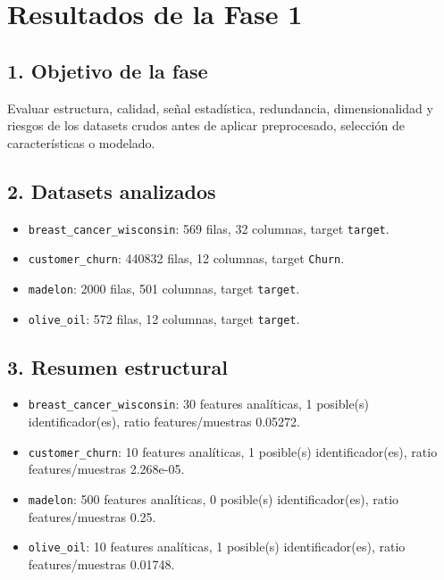\section{Resultados de la Fase 1}

\subsection{1. Objetivo de la fase}
Evaluar estructura, calidad, señal estadística, redundancia, dimensionalidad y riesgos de los datasets crudos antes de aplicar preprocesado, selección de características o modelado.
\subsection{2. Datasets analizados}
\begin{itemize}
\item \texttt{breast\_cancer\_wisconsin}: 569 filas, 32 columnas, target \texttt{target}.
\item \texttt{customer\_churn}: 440832 filas, 12 columnas, target \texttt{Churn}.
\item \texttt{madelon}: 2000 filas, 501 columnas, target \texttt{target}.
\item \texttt{olive\_oil}: 572 filas, 12 columnas, target \texttt{target}.
\end{itemize}

\subsection{3. Resumen estructural}
\begin{itemize}
\item \texttt{breast\_cancer\_wisconsin}: 30 features analíticas, 1 posible(s) identificador(es), ratio features/muestras 0.05272.
\item \texttt{customer\_churn}: 10 features analíticas, 1 posible(s) identificador(es), ratio features/muestras 2.268e-05.
\item \texttt{madelon}: 500 features analíticas, 0 posible(s) identificador(es), ratio features/muestras 0.25.
\item \texttt{olive\_oil}: 10 features analíticas, 1 posible(s) identificador(es), ratio features/muestras 0.01748.
\end{itemize}

